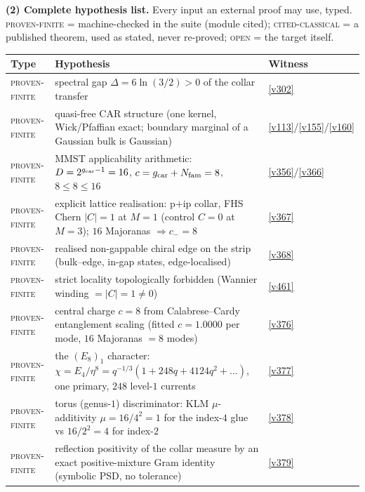 \par\smallskip\noindent\textbf{(2) Complete hypothesis list.} Every input an external proof may
use, typed. \textsc{proven-finite} = machine-checked in the suite (module cited);
\textsc{cited-classical} = a published theorem, used as stated, never re-proved;
\textsc{open} = the target itself.
\begin{center}\footnotesize
\renewcommand{\arraystretch}{1.22}
\begin{tabularx}{\linewidth}{@{}l>{\hsize=1.45\hsize\raggedright\arraybackslash}X>{\hsize=0.55\hsize\raggedright\arraybackslash}X@{}}
\toprule
\textbf{Type} & \textbf{Hypothesis} & \textbf{Witness} \\
\midrule
\textsc{proven-finite} & spectral gap $\Delta=6\ln(3/2)>0$ of the collar transfer & \vref{v302} \\
\textsc{proven-finite} & quasi-free CAR structure (one kernel, Wick/Pfaffian exact; boundary marginal of a Gaussian bulk is Gaussian) & \vref{v113}/\vref{v155}/\vref{v160} \\
\textsc{proven-finite} & MMST applicability arithmetic: $D=2^{g_{\mathrm{car}}-1}=16$, $c=g_{\mathrm{car}}+N_{\mathrm{fam}}=8$, $8\le8\le16$ & \vref{v356}/\vref{v366} \\
\textsc{proven-finite} & explicit lattice realisation: p$+$ip collar, FHS Chern $|C|=1$ at $M{=}1$ (control $C=0$ at $M{=}3$); $16$ Majoranas $\Rightarrow c_-=8$ & \vref{v367} \\
\textsc{proven-finite} & realised non-gappable chiral edge on the strip (bulk--edge, in-gap states, edge-localised) & \vref{v368} \\
\textsc{proven-finite} & strict locality topologically forbidden (Wannier winding $=|C|=1\neq0$) & \vref{v461} \\
\textsc{proven-finite} & central charge $c=8$ from Calabrese--Cardy entanglement scaling (fitted $c=1.0000$ per mode, $16$ Majoranas $=8$ modes) & \vref{v376} \\
\textsc{proven-finite} & the $(E_8)_1$ character: $\chi=E_4/\eta^8=q^{-1/3}(1+248q+4124q^2+\dots)$, one primary, $248$ level-$1$ currents & \vref{v377} \\
\textsc{proven-finite} & torus (genus-$1$) discriminator: KLM $\mu$-additivity $\mu=16/4^2=1$ for the index-$4$ glue vs $16/2^2=4$ for index-$2$ & \vref{v378} \\
\textsc{proven-finite} & reflection positivity of the collar measure by an exact positive-mixture Gram identity (symbolic PSD, no tolerance) & \vref{v379} \\

\end{tabularx}
\end{center}
